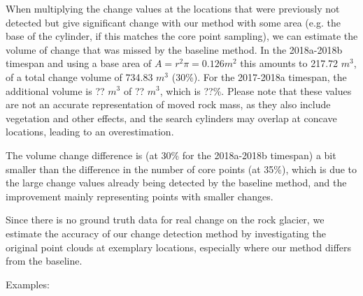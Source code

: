 \documentclass[preprint,12pt,3p]{elsarticle}
\begin{document}
When multiplying the change values at the locations that were previously not detected but give significant change with our method with some area (e.g. the base of the cylinder, if this matches the core point sampling), we can estimate the volume of change that was missed by the baseline method. In the 2018a-2018b timespan and using a base area of $A=r^2\pi=0.126m^2$ this amounts to 217.72 $m^3$, of a total change volume of 734.83 $m^3$ (30\%). For the 2017-2018a timespan, the additional volume is ?? $m^3$ of ?? $m^3$, which is ??\%. Please note that these values are not an accurate representation of moved rock mass, as they also include vegetation and other effects, and the search cylinders may overlap at concave locations, leading to an overestimation. 

The volume change difference is (at 30\% for the 2018a-2018b timespan) a bit smaller than the difference in the number of core points (at 35\%), which is due to the large change values already being detected by the baseline method, and the improvement mainly representing points with smaller changes.

Since there is no ground truth data for real change on the rock glacier, we estimate the accuracy of our change detection method by investigating the original point clouds at exemplary locations, especially where our method differs from the baseline. 

Examples:
\end{document}
